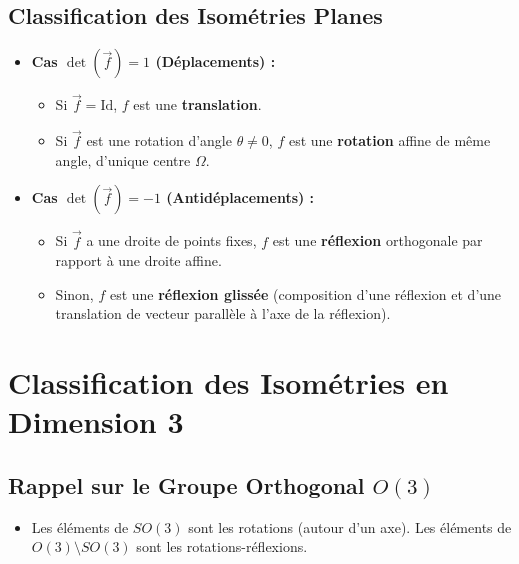 \documentclass[12pt, a4paper, parskip=full]{report}
\theoremstyle{agregstyle}
\begin{document}
\subsection{Classification des Isométries Planes}
\begin{itemize}
    \item \textbf{Cas $\det(\vec{f})=1$ (Déplacements) :}
        \begin{itemize}
            \item Si $\vec{f} = \mathrm{Id}$, $f$ est une \textbf{translation}.
            \item Si $\vec{f}$ est une rotation d'angle $\theta \neq 0$, $f$ est une \textbf{rotation} affine de même angle, d'unique centre $\Omega$.
        \end{itemize}
    \item \textbf{Cas $\det(\vec{f})=-1$ (Antidéplacements) :}
        \begin{itemize}
            \item Si $\vec{f}$ a une droite de points fixes, $f$ est une \textbf{réflexion} orthogonale par rapport à une droite affine.
            \item Sinon, $f$ est une \textbf{réflexion glissée} (composition d'une réflexion et d'une translation de vecteur parallèle à l'axe de la réflexion).
        \end{itemize}
\end{itemize}

\section{Classification des Isométries en Dimension 3}

\subsection{Rappel sur le Groupe Orthogonal $O(3)$}
\begin{itemize}
    \item Les éléments de $SO(3)$ sont les rotations (autour d'un axe). Les éléments de $O(3) \setminus SO(3)$ sont les rotations-réflexions.
\end{itemize}
\end{document}
